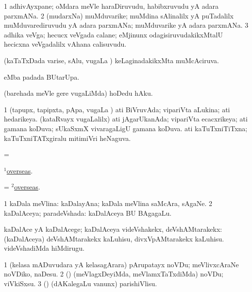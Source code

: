 \bentry
{}
\gl{\nA}
\bmng
\bnum
\num{1} adhivAyxpane; oMdara meVle haraDiruvudu, habibxruvudu yA adara parxmANa. 
\num{2} (mudarxNa) muMduvarike; muMdina sAlinalilx yA puTadalilx muMduvarediruvudu yA adara parxmANa; muMduvarike yA adara parxmANa. 
\num{3} adhika veVga; hecucx veVgada calane; eMjinunx odagisiruvudakikxMtalU hecicxna veVgadalilx vAhana calisuvudu. 
\enum
\emng
\eentry


\bentry
{}
\gl{\gu}
\bmng
(kaTaTxDada varise, sAlu, \mo vugaLa \vi) keLaginadakikxMta muMcAciruva. 
\emng
\eentry


\bentry
{}
\gl{\kirx}
\bmng
{} eMba padada BUtarUpa. 
\emng
\eentry


\bentry
{}
\gl{\sakirx}
\bmng
(barehada meVle gere \mo vugaLiMda) hoDedu hAku. 
\emng
\eentry


\bentry
{}
\gl{\gu}
\bmng
\bnum
\num{1} (tapupx, tapipxta, pApa, \mo vugaLa \vi) ati BiVruvAda; vipariVta aLukina; ati hedarikeya. 
 (kataRvayx \mo vugaLalilx) 
\banum
{} ati jAgarUkanAda; vipariVta ecacxrikeya; ati gamana koDuva; sUkaSxmX vivaragaLigU gamana koDuva. 
 ati kaTuTxniTiTxna; kaTuTxniTATxgiralu mitimiVri heNaguva. 
\eanum
\numie
\enum
\emng
\eentry

\bentry
{}
\gl{\gu}
\bmng
=
\hyperlink{overseas(1)}{$^1$overseas}. 
\emng
\eentry

\bentry
{}
\gl{\kirxvi}
\bmng
= \hyperlink{overseas(2)}{$^2$overseas}. 
\emng
\eentry

\bentry
{}
\gl{\gu}
\bmng
\bnum
\num{1} kaDala meVlina:  kaDalayAna; kaDala meVlina saMcAra, sAgaNe. 
\num{2} kaDalAceya; paradeVshada:  kaDalAceya BU BAgagaLu. 
\enum
\emng
\eentry


\bentry
{}
\gl{\kirxvi}
\bmng
kaDalAce yA kaDalAcege; kaDalAceya videVshakekx, deVshAMtarakekx:  (kaDalAceya) deVshAMtarakekx kaLuhisu, divxVpAMtarakekx kaLuhisu.  videVshadiMda hiMdirugu. 
\emng
\eentry


\bentry
{}
\gl{\sakirx}
\bmng
\bnum
\num{1} (kelasa mADuvudara yA kelasagArara) pArupatayx noVDu; meVlivxcAraNe noVDiko, naDesu. 
\num{2} (\pArxparx) (meVlagxDeyiMda, meVlamxTaTxdiMda) noVDu; viVkiSxsu. 
\num{3} (\pArxparx) (dAKalegaLu \mo vanunx) parishiVlisu. 
\enum
\emng
\eentry


